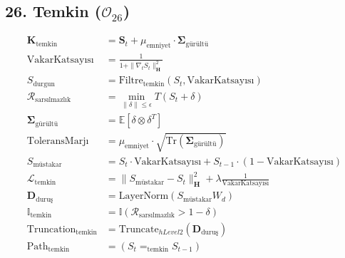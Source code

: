 \documentclass[11pt, a4paper]{article}
\begin{document}
\subsection{26. Temkin ($\mathcal{O}_{26}$)}
\begin{align}
\mathbf{K}_{\text{temkin}} &= \mathbf{S}_t + \mu_{\text{emniyet}} \cdot \mathbf{\Sigma}_{\text{gürültü}} \\
\text{VakarKatsayısı} &= \frac{1}{1 + \|\nabla_t S_t\|_{\mathbf{H}}^2} \\
S_{\text{durgun}} &= \text{Filtre}_{\text{temkin}}(S_t, \text{VakarKatsayısı}) \\
\mathcal{R}_{\text{sarsılmazlık}} &= \min_{\|\delta\| \le \epsilon} T(S_t + \delta) \\
\mathbf{\Sigma}_{\text{gürültü}} &= \mathbb{E}[\delta \otimes \delta^T] \\
\text{ToleransMarjı} &= \mu_{\text{emniyet}} \cdot \sqrt{\text{Tr}(\mathbf{\Sigma}_{\text{gürültü}})} \\
S_{\text{müstakar}} &= S_t \cdot \text{VakarKatsayısı} + S_{t-1} \cdot (1 - \text{VakarKatsayısı}) \\
\mathcal{L}_{\text{temkin}} &= \| S_{\text{müstakar}} - S_t \|_{\mathbf{H}}^2 + \lambda \frac{1}{\text{VakarKatsayısı}} \\
\mathbf{D}_{\text{duruş}} &= \text{LayerNorm}(S_{\text{müstakar}} W_d) \\
\mathbb{I}_{\text{temkin}} &= \mathbb{I}(\mathcal{R}_{\text{sarsılmazlık}} > 1 - \delta) \\
\text{Truncation}_{\text{temkin}} &= \text{Truncate}_{hLevel 2}(\mathbf{D}_{\text{duruş}}) \\
\text{Path}_{\text{temkin}} &= (S_t =_{\text{temkin}} S_{t-1})
\end{align}
\end{document}

